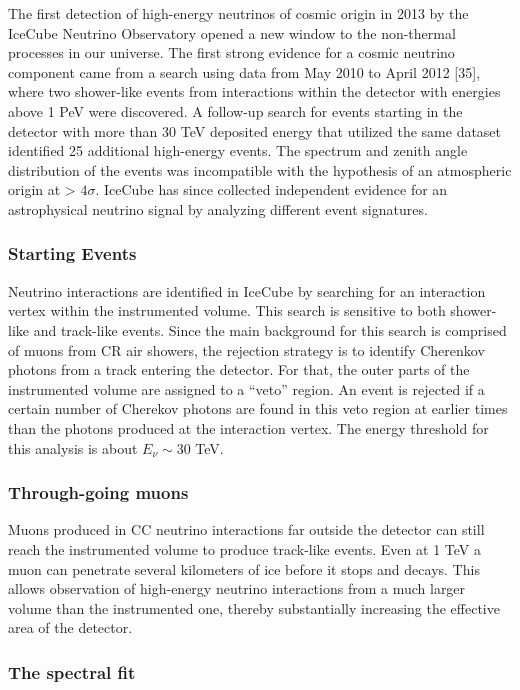 \documentclass[
  letterpaper,
  DIV=11,
  numbers=noendperiod]{scrreprt}
\begin{document}
The first detection of high-energy neutrinos of cosmic origin in 2013 by
the IceCube Neutrino Observatory opened a new window to the non-thermal
processes in our universe. The first strong evidence for a cosmic
neutrino component came from a search using data from May 2010 to April
2012 {[}35{]}, where two shower-like events from interactions within the
detector with energies above 1 PeV were discovered. A follow-up search
for events starting in the detector with more than 30 TeV deposited
energy that utilized the same dataset identified 25 additional
high-energy events. The spectrum and zenith angle distribution of the
events was incompatible with the hypothesis of an atmospheric origin at
\textgreater{} \(4\sigma\). IceCube has since collected independent
evidence for an astrophysical neutrino signal by analyzing different
event signatures.

\subsubsection{Starting Events}\label{starting-events}

Neutrino interactions are identified in IceCube by searching for an
interaction vertex within the instrumented volume. This search is
sensitive to both shower-like and track-like events. Since the main
background for this search is comprised of muons from CR air showers,
the rejection strategy is to identify Cherenkov photons from a track
entering the detector. For that, the outer parts of the instrumented
volume are assigned to a ``veto'' region. An event is rejected if a
certain number of Cherekov photons are found in this veto region at
earlier times than the photons produced at the interaction vertex. The
energy threshold for this analysis is about \(E_\nu \sim 30\) TeV.

\subsubsection{Through-going muons}\label{through-going-muons}

Muons produced in CC neutrino interactions far outside the detector can
still reach the instrumented volume to produce track-like events. Even
at 1 TeV a muon can penetrate several kilometers of ice before it stops
and decays. This allows observation of high-energy neutrino interactions
from a much larger volume than the instrumented one, thereby
substantially increasing the effective area of the detector.

\subsubsection{The spectral fit}\label{the-spectral-fit}
\end{document}
